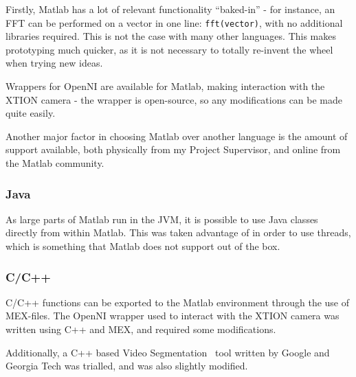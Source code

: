 Firstly, Matlab has a lot of relevant functionality ``baked-in'' - for instance, an \ac{FFT} can be performed on a vector in one line: \lstinline$fft(vector)$, with no additional libraries required. This is not the case with many other languages. This makes prototyping much quicker, as it is not necessary to totally re-invent the wheel when trying new ideas.

Wrappers for OpenNI are available for Matlab, making interaction with the XTION camera - the wrapper is open-source, so any modifications can be made quite easily.

Another major factor in choosing Matlab over another language is the amount of support available, both physically from my Project Supervisor, and online from the Matlab community. 

\subsubsection{Java}
As large parts of Matlab run in the \ac{JVM}, it is possible to use Java classes directly from within Matlab. This was taken advantage of in order to use threads, which is something that Matlab does not support out of the box. 

\subsubsection{C/C++}
C/C++ functions can be exported to the Matlab environment through the use of MEX-files. The OpenNI wrapper used to interact with the XTION camera was written using C++ and MEX, and required some modifications.

Additionally, a C++ based Video Segmentation~\cite{videosegment} tool written by Google and Georgia Tech was trialled, and was also slightly modified.
